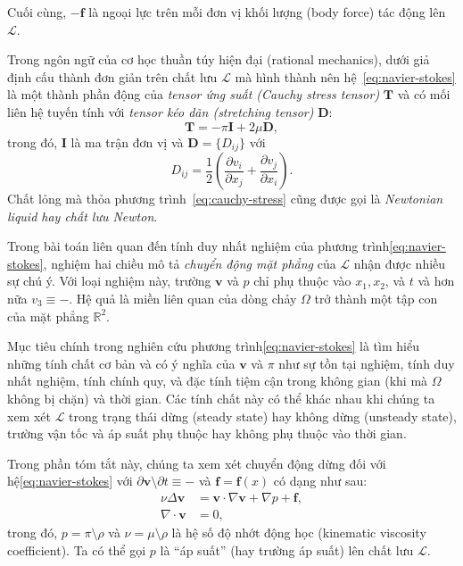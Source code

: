\documentclass{reportDoCS2025}
\newcommand{\R}{\mathbb{R}}
\newcommand{\bv}{\mathbf{v}}
\newcommand{\bT}{\mathbf{T}}
\newcommand{\bD}{\mathbf{D}}
\newcommand{\bI}{\mathbf{I}}
\begin{document}
Cuối cùng, $-\mathbf{f}$ là ngoại lực trên mỗi đơn vị khối lượng (body force) tác động lên $\mathcal{L}$.

Trong ngôn ngữ của cơ học thuần túy hiện đại (rational mechanics), dưới giả định cấu thành đơn giản trên chất lưu $\mathcal{L}$ mà hình thành nên hệ~\eqref{eq:navier-stokes} là một thành phần động của \textit{tensor ứng suất (Cauchy stress tensor)} $\bT$ và có mối liên hệ tuyến tính với \textit{tensor kéo dãn (stretching tensor)} $\bD$:
\begin{equation}\label{eq:cauchy-stress}
        \bT = -\pi\bI + 2\mu\bD,
\end{equation}
trong đó, $\bI$ là ma trận đơn vị và $\bD = \{D_{ij}\}$ với
\begin{equation}
        D_{ij} = \frac{1}{2}\left(\frac{\partial v_i}{\partial x_j} + \frac{\partial v_j}{\partial x_i}\right).
\end{equation}
Chất lỏng mà thỏa phương trình~\eqref{eq:cauchy-stress} cũng được gọi là \textit{Newtonian liquid hay chất lưu Newton}.

Trong bài toán liên quan đến tính duy nhất nghiệm của phương trình\eqref{eq:navier-stokes}, nghiệm hai chiều mô tả \textit{chuyển động mặt phẳng} của $\mathcal{L}$ nhận được nhiều sự chú ý. Với loại nghiệm này, trường $\bv$ và $p$ chỉ phụ thuộc vào $x_1, x_2$, và $t$ và hơn nữa $v_3 \equiv -$. Hệ quả là miền liên quan của dòng chảy $\Omega$ trở thành một tập con của mặt phẳng $\R^2$. 

Mục tiêu chính trong nghiên cứu phương trình\eqref{eq:navier-stokes} là tìm hiểu những tính chất cơ bản và có ý nghĩa của $\bv$ và $\pi$ như sự tồn tại nghiệm, tính duy nhất nghiệm, tính chính quy, và đặc tính tiệm cận trong không gian (khi mà $\Omega$ không bị chặn) và thời gian. Các tính chất này có thể khác nhau khi chúng ta xem xét $\mathcal{L}$ trong trạng thái dừng (steady state) hay không dừng (unsteady state), trường vận tốc và áp suất phụ thuộc hay không phụ thuộc vào thời gian.   

Trong phần tóm tắt này, chúng ta xem xét chuyển động dừng đối với hệ\eqref{eq:navier-stokes} với $\partial \bv \setminus \partial t \equiv -$ và $\mathbf{f} = \mathbf{f}(x)$ có dạng như sau:
\begin{equation}\label{eq:steady-navier-stokes}
        \begin{aligned}
                \nu\Delta\bv &= \bv \cdot \nabla \bv + \nabla p + \mathbf{f},\\
                \nabla \cdot \bv &= 0,
        \end{aligned}
\end{equation}
trong đó, $p = \pi \setminus \rho$ và $\nu = \mu \setminus \rho$ là hệ số độ nhớt động học (kinematic viscosity coefficient). Ta có thể gọi $p$ là ``áp suất'' (hay trường áp suất) lên chất lưu $\mathcal{L}$.
\end{document}
